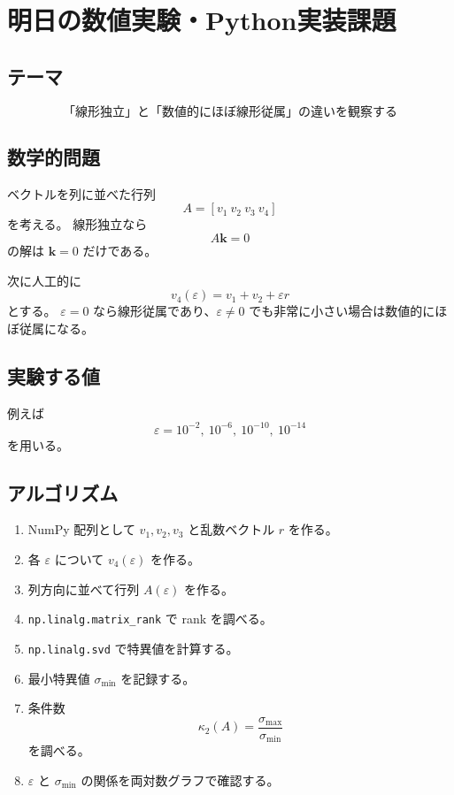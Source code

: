 \documentclass[a4paper,11pt]{ltjsarticle}
\begin{document}
\section{明日の数値実験・Python実装課題}

\subsection{テーマ}
\[
\boxed{\text{「線形独立」と「数値的にほぼ線形従属」の違いを観察する}}
\]

\subsection{数学的問題}
ベクトルを列に並べた行列
\[
A=[v_1\ v_2\ v_3\ v_4]
\]
を考える。
線形独立なら
\[
A\bm{k}=0
\]
の解は $\bm{k}=0$ だけである。

次に人工的に
\[
v_4(\varepsilon)=v_1+v_2+\varepsilon r
\]
とする。
$\varepsilon=0$ なら線形従属であり、$\varepsilon\neq0$ でも非常に小さい場合は数値的にほぼ従属になる。

\subsection{実験する値}
例えば
\[
\varepsilon=10^{-2},\ 10^{-6},\ 10^{-10},\ 10^{-14}
\]
を用いる。

\subsection{アルゴリズム}
\begin{enumerate}
  \item NumPy 配列として $v_1,v_2,v_3$ と乱数ベクトル $r$ を作る。
  \item 各 $\varepsilon$ について $v_4(\varepsilon)$ を作る。
  \item 列方向に並べて行列 $A(\varepsilon)$ を作る。
  \item \verb|np.linalg.matrix_rank| で rank を調べる。
  \item \verb|np.linalg.svd| で特異値を計算する。
  \item 最小特異値 $\sigma_{\min}$ を記録する。
  \item 条件数
  \[
  \kappa_2(A)=\frac{\sigma_{\max}}{\sigma_{\min}}
  \]
  を調べる。
  \item $\varepsilon$ と $\sigma_{\min}$ の関係を両対数グラフで確認する。
\end{enumerate}
\end{document}
